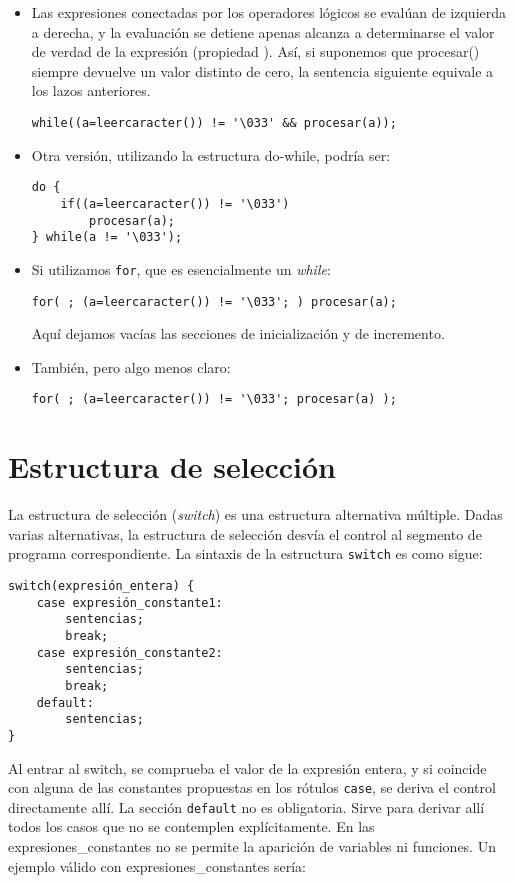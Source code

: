\begin{ejemplo}
\begin{itemize}
\item Las expresiones conectadas por los operadores lógicos se evalúan de izquierda a
derecha, y la evaluación se detiene apenas alcanza a determinarse el valor de
verdad de la expresión (propiedad ). Así, si suponemos que
procesar() siempre devuelve un valor distinto de cero, la sentencia siguiente equivale a los lazos anteriores.

\begin{lstlisting}
while((a=leercaracter()) != '\033' && procesar(a));
\end{lstlisting}
\item Otra versión, utilizando la estructura do-while, podría ser:
\begin{lstlisting}
do {
    if((a=leercaracter()) != '\033')
        procesar(a);
} while(a != '\033');
\end{lstlisting}

\item Si utilizamos \lstinline{for}, que es esencialmente un \textit{while}:

\begin{lstlisting}
for( ; (a=leercaracter()) != '\033'; ) procesar(a);
\end{lstlisting}

Aquí dejamos vacías las secciones de inicialización y de incremento. 
\item También, pero algo menos claro:

\begin{lstlisting}
for( ; (a=leercaracter()) != '\033'; procesar(a) );
\end{lstlisting}
\end{itemize}
\end{ejemplo}

\section{Estructura de selección}

La estructura de selección (\textit{switch}) es una estructura alternativa múltiple. Dadas varias alternativas, la estructura de selección desvía el control al
segmento de programa correspondiente. La sintaxis de la estructura \lstinline{switch} es
como sigue:
\begin{lstlisting}
switch(expresión_entera) {
    case expresión_constante1:
        sentencias;
        break;
    case expresión_constante2:
        sentencias;
        break;
    default:
        sentencias;
}
\end{lstlisting}
Al entrar al switch, se comprueba el valor de la expresión entera, y si
coincide con alguna de las constantes propuestas en los rótulos \lstinline{case}, se deriva
el control directamente allí. La sección \lstinline{default} no es obligatoria. Sirve para
derivar allí todos los casos que no se contemplen explícitamente.
En las expresiones\_constantes no se permite la aparición de variables ni
funciones. Un ejemplo válido con expresiones\_constantes sería:

